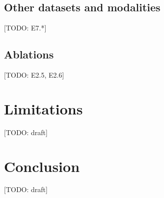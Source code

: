 \documentclass[10pt,twocolumn,letterpaper]{article}
\newcommand{\todo}[1]{{\color{red}[TODO: #1]}}
\begin{document}
\subsection{Other datasets and modalities}
\todo{E7.*}

\subsection{Ablations}
\todo{E2.5, E2.6}

\section{Limitations}
\todo{draft}

\section{Conclusion}
\todo{draft}

{\small}
\end{document}
